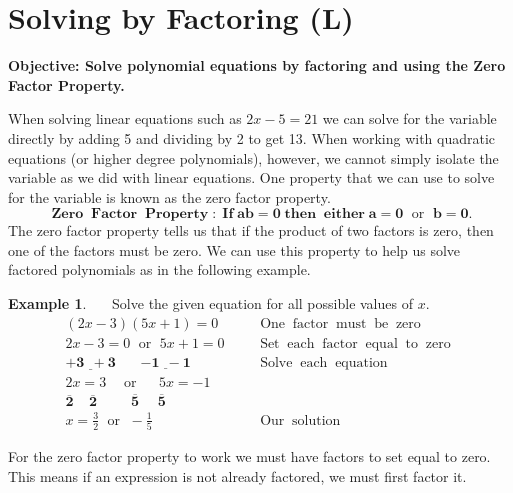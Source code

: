 \documentclass[12pt]{book}
\theoremstyle{definition}
\newtheorem{example}{Example}
\newcommand{\tmmathbf}[1]{\ensuremath{\boldsymbol{#1}}}
\newcommand{\tmop}[1]{\ensuremath{\operatorname{#1}}}
\begin{document}
\section{Solving by Factoring (L)}
{\bf Objective: Solve polynomial equations by factoring and using the Zero Factor Property.}\par
When solving linear equations such as $2 x - 5 = 21$ we can solve for the variable directly by adding 5 and dividing by 2 to get 13. When working with quadratic equations (or higher degree polynomials), however, we cannot simply isolate the variable as we did with linear equations.  One property that we can use to solve for the variable is known as the zero factor property.
\[ \tmmathbf{\tmop{Zero} \tmop{Factor} \tmop{Property} : \tmop{If} a b = 0
   \tmop{then} \tmop{either} a = 0 \tmop{~or~} b = 0.} \]
The zero factor property tells us that if the product of two factors is zero, then one of the factors must be zero.  We can use this property to help us solve factored polynomials as in the following example.
\begin{example}~~~Solve the given equation for all possible values of $x$.
  \begin{eqnarray*}
    (2 x - 3) (5 x + 1) = 0~~~ &  & \tmop{One} \tmop{factor} \tmop{must}
    \tmop{be} \tmop{zero}\\
    2 x - 3 = 0 \tmop{~or~} 5 x + 1 = 0~~~ &  & \tmop{Set} \tmop{each}
    \tmop{factor} \tmop{equal} \tmop{to} \tmop{zero}\\
    \tmmathbf{\underline{+ 3 ~~+ 3} ~~~~~~~~ \underline{- 1 ~~- 1}} &  & \tmop{Solve} \tmop{each}
    \tmop{equation}\\
    2 x = 3 \tmop{~~~or~~~~} 5 x = - 1~ &  & \\
    \tmmathbf{\overline{2} ~~~~~ \overline{2} ~~~~~~~~~~~ \overline{5} ~~~~~~ \overline{5}}~~ &  & \\
    x = \frac{3}{2} \tmop{~or~} -\frac{1}{5}~~~~~ &  & \tmop{Our} \tmop{solution}
  \end{eqnarray*}
\end{example}
For the zero factor property to work we must have factors to set equal to zero. This means if an expression is not already factored, we must first factor it.
\end{document}
